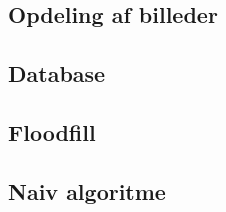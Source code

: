 \subsection{Opdeling af billeder}


\subsection{Database}


\subsection{Floodfill}


\subsection{Naiv algoritme}


